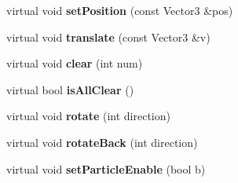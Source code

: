 \begin{DoxyCompactItemize}
\item 
\hypertarget{class_block_ab349f41487a18a2115d47f747f722ad1}{virtual void {\bfseries set\-Position} (const Vector3 \&pos)}\label{class_block_ab349f41487a18a2115d47f747f722ad1}

\item 
\hypertarget{class_block_a739df9c84276a9a3dd1ac4e5307e6c7a}{virtual void {\bfseries translate} (const Vector3 \&v)}\label{class_block_a739df9c84276a9a3dd1ac4e5307e6c7a}

\item 
\hypertarget{class_block_ad3798370b0029774ed9eed643c708c11}{virtual void {\bfseries clear} (int num)}\label{class_block_ad3798370b0029774ed9eed643c708c11}

\item 
\hypertarget{class_block_a7d465097ab0698661f4a3110319eca43}{virtual bool {\bfseries is\-All\-Clear} ()}\label{class_block_a7d465097ab0698661f4a3110319eca43}

\item 
\hypertarget{class_block_ab0ea780ca95354a851b69db9b0e77ceb}{virtual void {\bfseries rotate} (int direction)}\label{class_block_ab0ea780ca95354a851b69db9b0e77ceb}

\item 
\hypertarget{class_block_a324d004e47f5a904b5424f36a1ddc936}{virtual void {\bfseries rotate\-Back} (int direction)}\label{class_block_a324d004e47f5a904b5424f36a1ddc936}

\item 
\hypertarget{class_block_aaf3a4b01bbd67dc79a94f79e021ab0a3}{virtual void {\bfseries set\-Particle\-Enable} (bool b)}\label{class_block_aaf3a4b01bbd67dc79a94f79e021ab0a3}

\end{DoxyCompactItemize}
